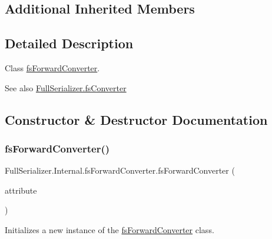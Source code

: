 \subsection*{Additional Inherited Members}


\subsection{Detailed Description}
Class \hyperlink{class_full_serializer_1_1_internal_1_1fs_forward_converter}{fs\+Forward\+Converter}. 

\begin{DoxySeeAlso}{See also}
\hyperlink{class_full_serializer_1_1fs_converter}{Full\+Serializer.\+fs\+Converter}


\end{DoxySeeAlso}


\subsection{Constructor \& Destructor Documentation}
\mbox{\label{class_full_serializer_1_1_internal_1_1fs_forward_converter_a485561a31edc65a3f1c6972af8b677e3}} 
\subsubsection{\texorpdfstring{fs\+Forward\+Converter()}{fsForwardConverter()}}
{\footnotesize\ttfamily Full\+Serializer.\+Internal.\+fs\+Forward\+Converter.\+fs\+Forward\+Converter (\begin{DoxyParamCaption}\item[{\hyperlink{class_full_serializer_1_1fs_forward_attribute}{fs\+Forward\+Attribute}}]{attribute }\end{DoxyParamCaption})\hspace{0.3cm}{\ttfamily [inline]}}



Initializes a new instance of the \hyperlink{class_full_serializer_1_1_internal_1_1fs_forward_converter}{fs\+Forward\+Converter} class. 


